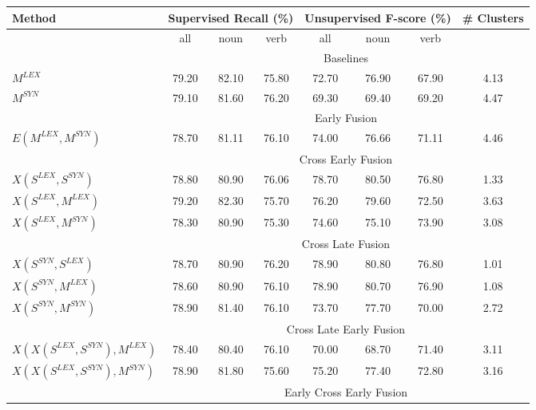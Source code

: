 \begin{table}[h!]
\centering
\begin{tabular}{@{}lccccccc@{}}
\toprule
Method & \multicolumn{3}{c}{Supervised Recall (\%)} & \multicolumn{3}{c}{Unsupervised F-score (\%)} & \# Clusters \\ \midrule
       & all           & noun          & verb          & all          & noun         & verb         &\\ 
       \midrule
       & \multicolumn{7}{c}{Baselines} \\ \midrule
       $M^{LEX}$                    & 79.20 & 82.10 & 75.80 &	72.70	 & 76.90 & 67.90 & 4.13\\
 

       $M^{SYN}$                    & 79.10 & 81.60 & 76.20 &	69.30	& 69.40 & 69.20 & 4.47\\
       \midrule
       &            \multicolumn{7}{c}{Early Fusion}       \\ \midrule
       $E(M^{LEX}, M^{SYN})$		& 78.70 & 81.11 & 76.10 &	74.00	& 76.66 & 71.11 & 4.46\\
	  \midrule
       &            \multicolumn{7}{c}{Cross Early Fusion}       \\ \midrule	         
	   $X(S^{LEX}, S^{SYN})$		& 78.80 & 80.90	& 76.06 &	78.70	& 80.50  & 76.80 & 1.33 \\

	   $X(S^{LEX}, M^{LEX})$		& 79.20 & 82.30 & 75.70 &	76.20	& 79.60 & 72.50 & 3.63 \\	   
       $X(S^{LEX}, M^{SYN})$		& 78.30 & 80.90 & 75.30 &	74.60	& 75.10 & 73.90 & 3.08 \\
 \midrule
       &            \multicolumn{7}{c}{Cross Late Fusion}       \\ \midrule
	   
 
	   $X(S^{SYN}, S^{LEX})$		& 78.70 & 80.90 & 76.20 &	78.90	& 80.80 & 76.80 & 1.01 \\
	   $X(S^{SYN}, M^{LEX})$		& 78.60 & 80.90 & 76.10 &	78.90	& 80.70 & 76.90	 & 1.08 \\	   
       $X(S^{SYN}, M^{SYN})$		& 78.90 & 81.40 & 76.10 &	73.70	& 77.70 & 70.00 & 2.72 \\
 \midrule
       &            \multicolumn{7}{c}{Cross Late Early Fusion}       \\ \midrule
	   
 


       $X(X(S^{LEX}, S^{SYN}), M^{LEX})$		& 78.40 & 80.40 & 76.10 &	70.00	&68.70  & 71.40& 3.11 \\	   
       $X(X(S^{LEX}, S^{SYN}), M^{SYN})$		& 78.90 & 81.80 & 75.60 &	75.20	& 77.40 & 72.80 & 3.16 \\	   
       	  \midrule
       &            \multicolumn{7}{c}{Early Cross Early Fusion}       \\ \midrule	         
       

\end{tabular}
\end{table}
